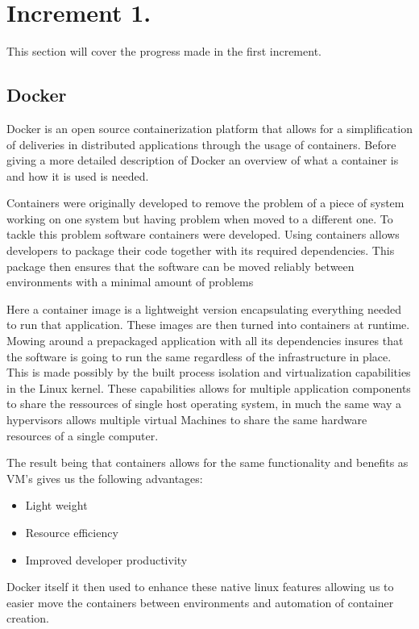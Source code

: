 \section{Increment 1.}
This section will cover the progress made in the first increment. 


\subsection{Docker}
Docker is an open source containerization platform that allows for a simplification of deliveries in distributed applications through the usage of containers. 
Before giving a more detailed description of Docker an overview of what a container is and how it is used is needed. 


Containers were originally developed to remove the problem of a piece of system working on one system but having problem when moved to a different one. 
To tackle this problem software containers were developed. 
Using containers allows developers to package their code together with its required dependencies. This package then ensures that the software can be moved reliably between environments with a minimal amount of problems


Here a container image is a lightweight version encapsulating everything needed to run that application. These images are then turned into containers at runtime. 
Mowing around a prepackaged application with all its dependencies insures that the software is going to run the same regardless of the infrastructure in place. 
This is made possibly by the built process isolation and virtualization capabilities in the Linux kernel. 
These capabilities allows for multiple application components to share the ressources of single host operating system, 
in much the same way a hypervisors allows multiple virtual Machines to share the same hardware resources of a single computer. 


The result being that containers allows for the same functionality and benefits as VM’s gives us the following advantages:

\begin{itemize}
    \item Light weight 
    \item Resource efficiency
    \item Improved developer productivity
\end{itemize}

Docker itself it then used to enhance these native linux features allowing us to easier move the containers between environments and automation of container creation.

